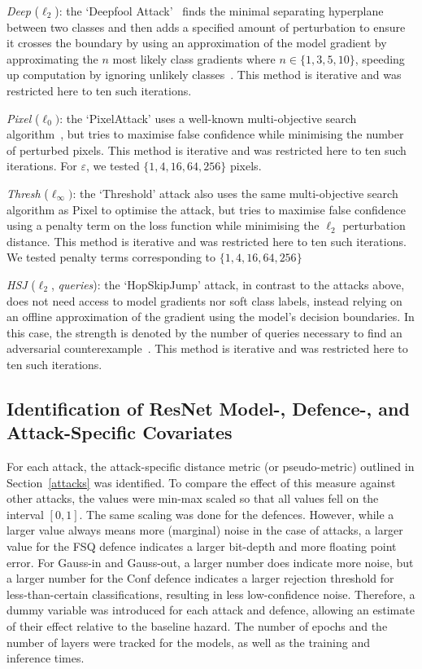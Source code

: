 \textit{Deep} ($\ell_2$): the `Deepfool Attack'~\cite{deepfool} finds the minimal separating hyperplane between two classes and then adds a specified amount of perturbation to ensure it crosses the boundary by using an approximation of the model gradient by approximating the $n$ most likely class gradients where $n \in \{1,3,5,10\}$, speeding up computation by ignoring unlikely classes~\cite{deepfool}. This method is iterative and was restricted here to ten such iterations.

\textit{Pixel} ($\ell_{0})$: the `PixelAttack' uses a well-known multi-objective search algorithm~\cite{pixelattack}, but tries to maximise false confidence while minimising the number of perturbed pixels. This method is iterative and was restricted here to ten such iterations. For $\varepsilon$, we tested $\{
1,4,16,64,256
\}$ pixels.

\textit{Thresh} ($\ell_{\infty})$: the `Threshold' attack also uses the same multi-objective search algorithm as Pixel to optimise the attack, but tries to maximise false confidence using a penalty term on the loss function while minimising the $\ell_2$ perturbation distance. This method is iterative and was restricted here to ten such iterations. We tested penalty terms corresponding to $\{ 1,4,16,64,256\}$





\textit{HSJ} ($\ell_2$, \textit{queries}): the `HopSkipJump' attack, in contrast to the attacks above, does not need access to model gradients nor soft class labels, instead relying on an offline approximation of the gradient using the model's decision boundaries. In this case, the strength is denoted by the number of queries necessary to find an adversarial counterexample~\cite{hopskipjump}. This method is iterative and was restricted here to ten such iterations.



\subsection{Identification of ResNet Model-, Defence-, and Attack-Specific Covariates}

For each attack, the attack-specific distance metric (or pseudo-metric) outlined in Section~\ref{attacks} was identified. To compare the effect of this measure against other attacks, the values were min-max scaled so that all values fell on the interval $[0,1]$. The same scaling was done for the defences. However, while a larger value always means more (marginal) noise in the case of attacks, a larger value for the FSQ defence indicates a larger bit-depth and more floating point error. For Gauss-in and Gauss-out, a larger number does indicate more noise, but a larger number for the Conf defence indicates a larger rejection threshold for less-than-certain classifications, resulting in less low-confidence noise. Therefore, a dummy variable was introduced for each attack and defence, allowing an estimate of their effect relative to the baseline hazard. The number of epochs and the number of layers were tracked for the models, as well as the training and inference times.




